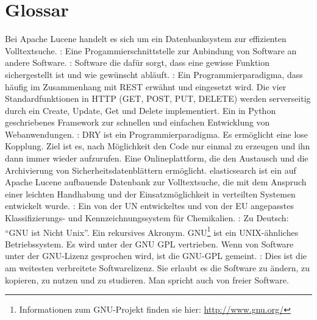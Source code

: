  \chapter{Glossar}
 \label{sec:Glossar_glo}

\begin{acronym}[Django-Framework]%
  Bei Apache Lucene handelt es sich um ein
 Datenbanksystem zur effizienten Volltextsuche.
 : Eine Progammierschnittstelle
 zur Anbindung von Software an andere Software.
 : Software die dafür sorgt, dass eine gewisse Funktion
 sichergestellt ist und wie gewünscht abläuft.
 : Ein Programmierparadigma, dass häufig
 im Zusammenhang mit \ac{REST} erwähnt und eingesetzt wird. Die vier
 Standardfunktionen in \ac{HTTP} (GET, POST, PUT, DELETE) werden serverseitig
 durch ein Create, Update, Get und Delete implementiert.
  Ein in Python geschriebenes Framework zur schnellen
 und einfachen Entwicklung von Webanwendungen.
 : DRY ist ein Programmierparadigma.
 Es ermöglicht eine lose Kopplung. Ziel ist es, nach Möglichkeit den Code nur
 einmal zu erzeugen und ihn dann immer wieder aufzurufen.
  Eine Onlineplattform, die den Austausch und die Archivierung von
 Sicherheitsdatenblättern ermöglicht.
  elasticsearch ist ein auf Apache Lucene aufbauende
 Datenbank zur Volltextsuche, die mit dem Anspruch einer leichten
 Handhabung und der Einsatzmöglichkeit in verteilten Systemen
 entwickelt wurde.
 : Ein von der UN entwickeltes und von der EU angepasstes
 Klassifizierungs- und Kennzeichnungssystem für Chemikalien.
 : Zu Deutsch: "`GNU ist Nicht Unix"'. Ein rekursives
 Akronym. GNU\footnote{Informationen zum GNU-Projekt finden sie
 hier: \url{http://www.gnu.org/}} ist ein UNIX-ähnliches Betriebssystem.
 Es wird unter der GNU \ac{GPL} vertrieben. Wenn von Software unter der GNU-Lizenz gesprochen wird,
 ist die GNU-\ac{GPL} gemeint.
 : Dies ist die am weitesten verbreitete
 Softwarelizenz. Sie erlaubt es die Software zu ändern, zu kopieren, zu nutzen
 und zu studieren. Man spricht auch von freier Software.

\end{acronym}
